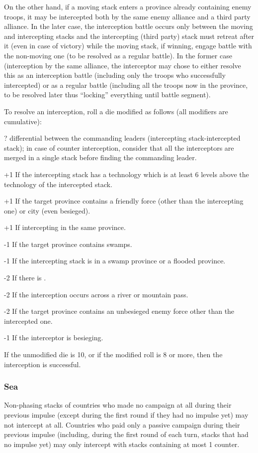 On the other hand, if a moving stack enters a province already containing
enemy troops, it may be intercepted both by the same enemy alliance and a
third party alliance. In the later case, the interception battle occurs only
between the moving and intercepting stacks and the intercepting (third party)
stack must retreat after it (even in case of victory) while the moving stack,
if winning, engage battle with the non-moving one (to be resolved as a regular
battle). In the former case (interception by the same alliance, the
interceptor may chose to either resolve this as an interception battle
(including only the troops who successfully intercepted) or as a regular
battle (including all the troops now in the province, to be resolved later
thus ``locking'' everything until battle segment).

To resolve an interception, roll a die modified as follows (all modifiers are
cumulative):
\begin{modlist}
\item[\textplusminus?] \Man differential between the commanding leaders
  (intercepting stack-intercepted stack); in case of counter interception,
  consider that all the interceptors are merged in a single stack before
  finding the commanding leader.
\item[+1] If the intercepting stack has a technology which is at least 6
  levels above the technology of the intercepted stack.
\item[+1] If the target province contains a friendly force (other than the
  intercepting one) or city (even besieged).
\item[+1] If intercepting in the same province.
\item[-1] If the target province contains swamps.
\item[-1] If the intercepting stack is in a swamp province or a flooded
  province.
\item[-2] If there is .
\item[-2] If the interception occurs across a river or mountain pass.
\item[-2] If the target province contains an unbesieged enemy force other than
  the intercepted one.
\item[-1] If the interceptor is besieging.
\end{modlist}

If the unmodified die is 10, or if the modified roll is 8 or more, then the
interception is successful.

\subsubsection{Sea}
Non-phasing stacks of countries who made no campaign at all during their
previous impulse (except during the first round if they had no impulse yet)
may not intercept at all. Countries who paid only a passive campaign during
their previous impulse (including, during the first round of each turn, stacks
that had no impulse yet) may only intercept with stacks containing at most 1
\FLEET counter.

